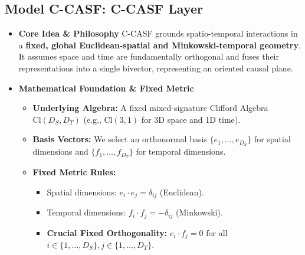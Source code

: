 \documentclass[11pt]{article}
\newcommand{\Cl}[2]{\text{Cl}(#1, #2)} %
\newcommand{\Ds}{D_S} %
\newcommand{\Dt}{D_T} %
\newenvironment{modeldescription}[1]{%
    \subsection*{Model #1: \MakeUppercase{#1} Layer}%
    \begin{itemize}[leftmargin=*,noitemsep]%
}{%
    \end{itemize}%
}
\begin{document}
\begin{modeldescription}{C-CASF}
    \item \textbf{Core Idea \& Philosophy}
    C-CASF grounds spatio-temporal interactions in a \textbf{fixed, global Euclidean-spatial and Minkowski-temporal geometry}. It assumes space and time are fundamentally orthogonal and fuses their representations into a single bivector, representing an oriented causal plane.

    \item \textbf{Mathematical Foundation \& Fixed Metric}
    \begin{itemize}[noitemsep]
        \item \textbf{Underlying Algebra:} A fixed mixed-signature Clifford Algebra $\Cl{\Ds}{\Dt}$ (e.g., $\Cl{3}{1}$ for 3D space and 1D time).
        \item \textbf{Basis Vectors:} We select an orthonormal basis $\{e_1, \dots, e_{\Ds}\}$ for spatial dimensions and $\{f_1, \dots, f_{\Dt}\}$ for temporal dimensions.
        \item \textbf{Fixed Metric Rules:}
        \begin{itemize}[noitemsep]
            \item Spatial dimensions: $e_i \cdot e_j = \delta_{ij}$ (Euclidean).
            \item Temporal dimensions: $f_i \cdot f_j = -\delta_{ij}$ (Minkowski).
            \item \textbf{Crucial Fixed Orthogonality:} $e_i \cdot f_j = 0$ for all $i \in \{1,\dots,\Ds\}, j \in \{1,\dots,\Dt\}$.
        \end{itemize}
    \end{itemize}


\end{modeldescription}
\end{document}
